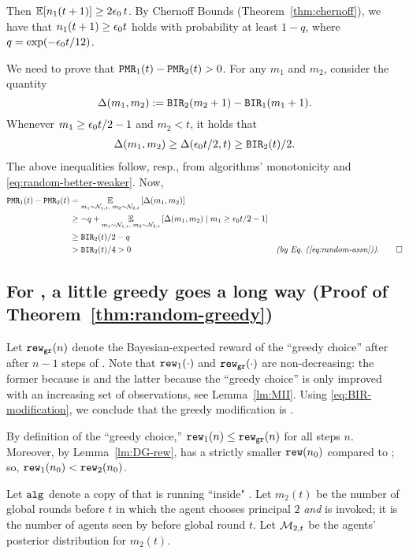 Then
    $\E[n_1(t+1)] \geq 2\eps_0\,t $.
By Chernoff Bounds (Theorem~\ref{thm:chernoff}), we have that
    $n_1(t+1)\geq \epsilon_0 t$
holds with probability at least $1-q$,
where $q = \exp(-\epsilon_0 t/12)$.

We need to prove that
    $\mathtt{PMR}_1(t) - \mathtt{PMR}_2(t)>0$.
For any $m_1$ and $m_2$, consider the quantity
\[ \Delta(m_1,m_2) := \mathtt{BIR}_2(m_2+1) - \mathtt{BIR}_1(m_1+1).\]
Whenever $m_1 \geq \epsilon_0 t/2 -1$ and $m_2<t$, it holds that
\begin{align*}
\Delta(m_1,m_2) \geq \Delta(\epsilon_0 t / 2, t)
    \geq \mathtt{BIR}_2(t)/2.
\end{align*}
The above inequalities follow, resp., from algorithms' monotonicity and \eqref{eq:random-better-weaker}. Now,
\begin{align*}
\PMR_1(t) - \PMR_2(t)
    &= \Ex{m_1\sim \posteriorN{1}{t},\;m_2\sim \posteriorN{2}{t}}{\Delta(m_1,m_2)} \\
    &\geq -q
        + \Ex{m_1\sim \posteriorN{1}{t},\;m_2\sim \posteriorN{2}{t}}
            {\Delta(m_1,m_2)\mid m_1 \geq \eps_0 t/2-1} \\
    &\geq \BIR_2(t)/2-q \\
    &> \BIR_2(t)/4 > 0
    &\EqComment{by \refeq{eq:random-assn}}. \qedhere
\end{align*}

\subsection{For \HardMaxRandom, a little greedy goes a long way
(Proof of Theorem~\ref{thm:random-greedy})}
\label{sec:proofs-HMR-main}


  Let $\mathtt{rew}_{\texttt{gr}}(n)$ denote the Bayesian-expected reward of the ``greedy
  choice'' after after $n-1$ steps of \alg[1]. Note that
  $\mathtt{rew}_1(\cdot)$ and $\mathtt{rew}_{\texttt{gr}}(\cdot)$ are non-decreasing: the former
  because \alg[1] is \bmonotone and the latter because the ``greedy
  choice'' is only improved with an increasing set of
  observations, see Lemma~\ref{lm:MII}.
Using \eqref{eq:BIR-modification}, we conclude that
the greedy modification \alg[2] is \bmonotone.

  By definition of the ``greedy choice,'' $\mathtt{rew}_1(n)\leq \mathtt{rew}_{\texttt{gr}}(n)$
  for all steps $n$. Moreover, by Lemma~\ref{lm:DG-rew},
  \alg[1] has a strictly smaller $\mathtt{rew}(n_0)$ compared to \DynGreedy;
  so, $\mathtt{rew}_1(n_0)<\mathtt{rew}_2(n_0)$.

Let $\mathtt{alg}_{}$ denote a copy of \alg[1] that is running ``inside" \alg[2]. Let $m_2(t)$ be the number of global rounds before $t$ in which the agent chooses principal $2$ \emph{and} \alg is invoked; \ie it is the number of agents seen by \alg before global round $t$. Let $\mathcal{M}_{2,t}$ be the agents' posterior distribution for $m_2(t)$.

